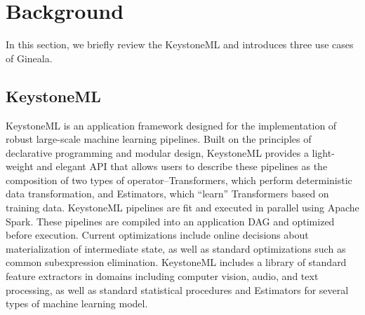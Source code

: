 \documentclass{sig-alternate}
\begin{document}

\section{Background}
\label{sec:Background}
In this section, we briefly review the KeystoneML and introduces three use cases of Gineala.

\subsection{KeystoneML}
KeystoneML is an application framework designed for the implementation of robust large-scale machine learning pipelines. Built on the principles of declarative programming and modular design, KeystoneML provides a light-weight and elegant API that allows users to describe these pipelines as the composition of two types of operator--Transformers, which perform deterministic data transformation, and Estimators, which ``learn'' Transformers based on training data. KeystoneML pipelines are fit and executed in parallel using Apache Spark. These pipelines are compiled into an application DAG and optimized before execution. Current optimizations include online decisions about materialization of intermediate state, as well as standard optimizations such as common subexpression elimination. KeystoneML includes a library of standard feature extractors in domains including computer vision, audio, and text processing, as well as standard statistical procedures and Estimators for several types of machine learning model.
\end{document}
